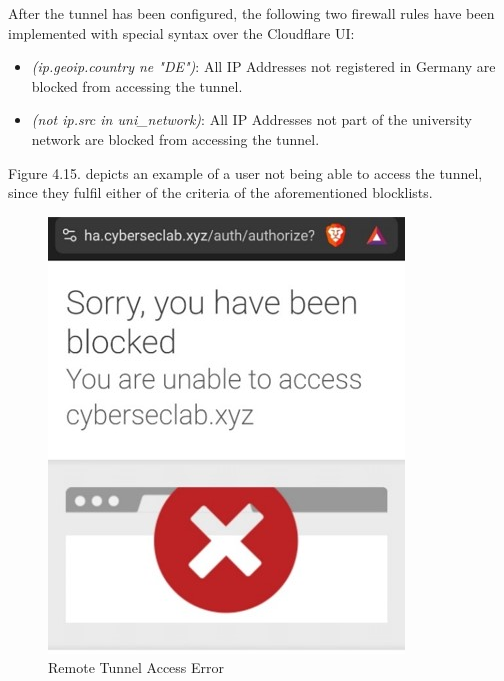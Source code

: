 After the tunnel has been configured, the following two firewall rules have been implemented with special syntax over the Cloudflare UI:
\begin{itemize}
    \item \textit{(ip.geoip.country ne "DE")}: All IP Addresses not registered in Germany are blocked from accessing the tunnel.
    \item \textit{(not ip.src in uni\_network)}: All IP Addresses not part of the university network are blocked from accessing the tunnel.
\end{itemize}

Figure 4.15. depicts an example of a user not being able to access the tunnel, since they fulfil either of the criteria of the aforementioned blocklists.
\begin{figure}[H]
	\centering
	\includegraphics[width=0.4 \linewidth]{Images/K4/Picture19.jpg}
	\caption{Remote Tunnel Access Error}
	\label{fig:tunnel_error}
\end{figure}


